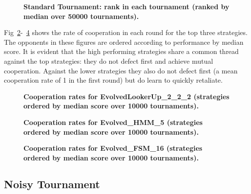\documentclass[10pt,letterpaper]{article}
\begin{document}
\begin{figure}[!hbtp]
    \centering
    \caption{\bf Standard Tournament: rank in each tournament (ranked by
    median over
    50000 tournaments).}
    \label{fig:standard_ranks_boxplot}
\end{figure}

Fig~\ref{fig:comparison_cooperation_heatmaps_standard_1}-~\ref{fig:comparison_cooperation_heatmaps_standard_3}
    shows the rate of
cooperation in each round for the top three strategies. The opponents in these
figures are ordered according to performance by median score. It is evident that
the high performing strategies share a common thread against the top strategies:
they do not defect first and achieve mutual cooperation. Against the lower
strategies they also do not defect first (a mean cooperation rate of 1 in the
first round) but do learn to quickly retaliate.

\begin{figure}[!hbtp]
        \centering
        \caption{\bf Cooperation rates for EvolvedLookerUp\_2\_2\_2
            (strategies ordered by median score over 10000 tournaments).}
        \label{fig:comparison_cooperation_heatmaps_standard_1}
\end{figure}

\begin{figure}[!hbtp]
        \centering
        \caption{\bf Cooperation rates for Evolved\_HMM\_5
            (strategies ordered by median score over 10000 tournaments).}
        \label{fig:comparison_cooperation_heatmaps_standard_2}
\end{figure}

\begin{figure}[!hbtp]
        \centering
        \caption{\bf Cooperation rates for Evolved\_FSM\_16 
            (strategies ordered by median score over 10000 tournaments).}
        \label{fig:comparison_cooperation_heatmaps_standard_3}
\end{figure}

\subsection*{Noisy Tournament}\label{sec:noise}
\end{document}
